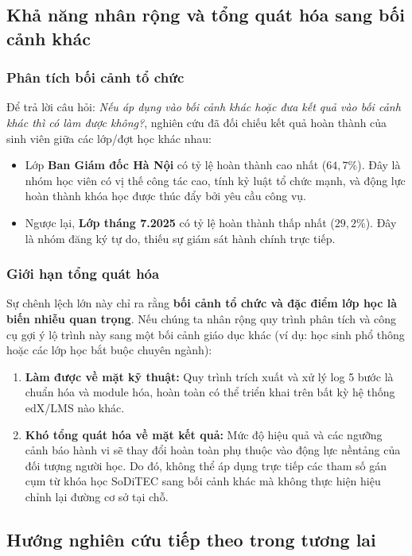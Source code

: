 \subsection{Khả năng nhân rộng và tổng quát hóa sang bối cảnh khác}

\subsubsection{Phân tích bối cảnh tổ chức}
Để trả lời câu hỏi: \textit{Nếu áp dụng vào bối cảnh khác hoặc đưa kết quả vào bối cảnh khác thì có làm được không?}, nghiên cứu đã đối chiếu kết quả hoàn thành của sinh viên giữa các lớp/đợt học khác nhau:
\begin{itemize}
    \item Lớp \textbf{Ban Giám đốc Hà Nội} có tỷ lệ hoàn thành cao nhất ($64,7\%$). Đây là nhóm học viên có vị thế công tác cao, tính kỷ luật tổ chức mạnh, và động lực hoàn thành khóa học được thúc đẩy bởi yêu cầu công vụ.
    \item Ngược lại, \textbf{Lớp tháng 7.2025} có tỷ lệ hoàn thành thấp nhất ($29,2\%$). Đây là nhóm đăng ký tự do, thiếu sự giám sát hành chính trực tiếp.
\end{itemize}

\subsubsection{Giới hạn tổng quát hóa}
Sự chênh lệch lớn này chỉ ra rằng \textbf{bối cảnh tổ chức và đặc điểm lớp học là biến nhiễu quan trọng}. Nếu chúng ta nhân rộng quy trình phân tích và công cụ gợi ý lộ trình này sang một bối cảnh giáo dục khác (ví dụ: học sinh phổ thông hoặc các lớp học bắt buộc chuyên ngành):
\begin{enumerate}
    \item \textbf{Làm được về mặt kỹ thuật:} Quy trình trích xuất và xử lý log 5 bước là chuẩn hóa và module hóa, hoàn toàn có thể triển khai trên bất kỳ hệ thống edX/LMS nào khác.
    \item \textbf{Khó tổng quát hóa về mặt kết quả:} Mức độ hiệu quả và các ngưỡng cảnh báo hành vi sẽ thay đổi hoàn toàn phụ thuộc vào động lực nềntảng của đối tượng người học. Do đó, không thể áp dụng trực tiếp các tham số gán cụm từ khóa học SoDiTEC sang bối cảnh khác mà không thực hiện hiệu chỉnh lại đường cơ sở tại chỗ.
\end{enumerate}

\subsection{Hướng nghiên cứu tiếp theo trong tương lai}

